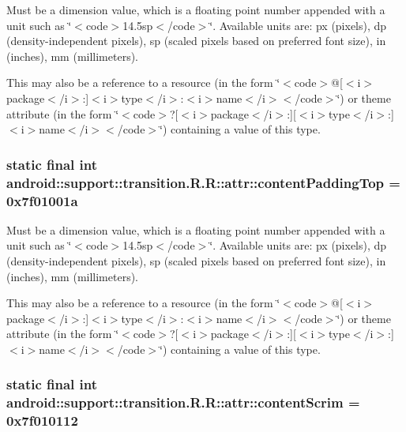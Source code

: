 Must be a dimension value, which is a floating point number appended with a unit such as \char`\"{}$<$code$>$14.5sp$<$/code$>$\char`\"{}. Available units are: px (pixels), dp (density-independent pixels), sp (scaled pixels based on preferred font size), in (inches), mm (millimeters). 

This may also be a reference to a resource (in the form \char`\"{}$<$code$>$@\mbox{[}$<$i$>$package$<$/i$>$:\mbox{]}$<$i$>$type$<$/i$>$:$<$i$>$name$<$/i$>$$<$/code$>$\char`\"{}) or theme attribute (in the form \char`\"{}$<$code$>$?\mbox{[}$<$i$>$package$<$/i$>$:\mbox{]}\mbox{[}$<$i$>$type$<$/i$>$:\mbox{]}$<$i$>$name$<$/i$>$$<$/code$>$\char`\"{}) containing a value of this type. \hypertarget{classandroid_1_1support_1_1transition_1_1_r_1_1attr_36ff67a7e5c45116443239b21aae6794}{
\subsubsection[{contentPaddingTop}]{\setlength{\rightskip}{0pt plus 5cm}static final int android::support::transition.R.R::attr::contentPaddingTop = 0x7f01001a}}
\label{classandroid_1_1support_1_1transition_1_1_r_1_1attr_36ff67a7e5c45116443239b21aae6794}


Must be a dimension value, which is a floating point number appended with a unit such as \char`\"{}$<$code$>$14.5sp$<$/code$>$\char`\"{}. Available units are: px (pixels), dp (density-independent pixels), sp (scaled pixels based on preferred font size), in (inches), mm (millimeters). 

This may also be a reference to a resource (in the form \char`\"{}$<$code$>$@\mbox{[}$<$i$>$package$<$/i$>$:\mbox{]}$<$i$>$type$<$/i$>$:$<$i$>$name$<$/i$>$$<$/code$>$\char`\"{}) or theme attribute (in the form \char`\"{}$<$code$>$?\mbox{[}$<$i$>$package$<$/i$>$:\mbox{]}\mbox{[}$<$i$>$type$<$/i$>$:\mbox{]}$<$i$>$name$<$/i$>$$<$/code$>$\char`\"{}) containing a value of this type. \hypertarget{classandroid_1_1support_1_1transition_1_1_r_1_1attr_0a4b8de21e64510fa5e602901ac3298d}{
\subsubsection[{contentScrim}]{\setlength{\rightskip}{0pt plus 5cm}static final int android::support::transition.R.R::attr::contentScrim = 0x7f010112}}
\label{classandroid_1_1support_1_1transition_1_1_r_1_1attr_0a4b8de21e64510fa5e602901ac3298d}


